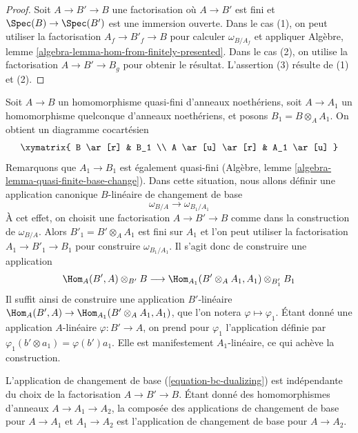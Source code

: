 \begin{proof}
Soit $A \to B' \to B$ une factorisation où $A \to B'$ est fini et
$\Spec(B) \to \Spec(B')$ est une immersion ouverte. Dans le cas (1), on peut utiliser
la factorisation $A_f \to B'_f \to B$ pour calculer $\omega_{B/A_f}$
et appliquer Algèbre, lemme \ref{algebra-lemma-hom-from-finitely-presented}.
Dans le cas (2), on utilise la factorisation $A \to B' \to B_g$ pour obtenir le résultat.
L'assertion (3) résulte de (1) et (2).
\end{proof}

\noindent
Soit $A \to B$ un homomorphisme quasi-fini d'anneaux noethériens, soit
$A \to A_1$ un homomorphisme quelconque d'anneaux noethériens, et posons
$B_1 = B \otimes_A A_1$. On obtient un diagramme cocartésien
$$
\xymatrix{
B \ar[r] & B_1 \\
A \ar[u] \ar[r] & A_1 \ar[u]
}
$$
Remarquons que $A_1 \to B_1$ est également quasi-fini (Algèbre, lemme
\ref{algebra-lemma-quasi-finite-base-change}).
Dans cette situation, nous allons définir une application canonique
$B$-linéaire de changement de base
\begin{equation}
\label{equation-bc-dualizing}
\omega_{B/A} \longrightarrow \omega_{B_1/A_1}
\end{equation}
À cet effet, on choisit une factorisation $A \to B' \to B$ comme dans la construction
de $\omega_{B/A}$. Alors $B'_1 = B' \otimes_A A_1$ est fini sur $A_1$
et l'on peut utiliser la factorisation $A_1 \to B'_1 \to B_1$ pour construire
$\omega_{B_1/A_1}$. Il s'agit donc de construire une application
$$
\Hom_A(B', A) \otimes_{B'} B
\longrightarrow
\Hom_{A_1}(B' \otimes_A A_1, A_1) \otimes_{B'_1} B_1
$$
Il suffit ainsi de construire une application $B'$-linéaire
$\Hom_A(B', A) \to \Hom_{A_1}(B' \otimes_A A_1, A_1)$,
que l'on notera $\varphi \mapsto \varphi_1$.
Étant donné une application $A$-linéaire $\varphi : B' \to A$,
on prend pour $\varphi_1$ l'application définie par
$\varphi_1(b' \otimes a_1) = \varphi(b')a_1$.
Elle est manifestement $A_1$-linéaire, ce qui achève la construction.

\begin{lemma}
\label{lemma-bc-map-dualizing}
L'application de changement de base (\ref{equation-bc-dualizing})
est indépendante du choix de la
factorisation $A \to B' \to B$. Étant donné des homomorphismes d'anneaux $A \to A_1 \to A_2$,
la composée des applications de changement de base pour $A \to A_1$ et $A_1 \to A_2$
est l'application de changement de base pour $A \to A_2$.
\end{lemma}

